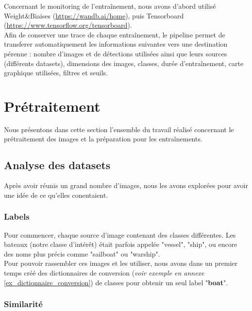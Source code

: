 Concernant le monitoring de l'entraînement, nous avons d'abord utilisé Weight\&Biaises
(\url{https://wandb.ai/home}), puis Tensorboard (\url{https://www.tensorflow.org/tensorboard}). \\

Afin de conserver une trace de chaque entraînement, le pipeline permet de transferer automatiquement
les informations suivantes vers une destination pérenne : nombre d'images et de détections utilisées
ainsi que leurs sources (différents datasets), dimensions des images, classes, durée d'entraînement,
carte graphique utilisées, filtres et seuils. \\

\section{Prétraitement}

Nous présentons dans cette section l'ensemble du travail réalisé concernant le prétraitement des images
et la préparation pour les entraînements.

\subsection{Analyse des datasets}

Après avoir réunis un grand nombre d'images, nous les avons explorées pour avoir une idée de ce qu'elles
conentaient.

\subsubsection{Labels}

Pour commencer, chaque source d'image contenant des classes différentes. Les bateaux
(notre classe d'intérêt) était parfois appelée "vessel", "ship", ou encore des noms plus précis
comme "sailboat" ou "warship".\\

Pour pouvoir rassembler ces images et les utiliser, nous avons dans un premier temps
créé des dictionnaires de conversion (\textit{voir exemple en annexe }\ref{ex_dictionnaire_conversion}) de classes pour obtenir un seul label "\textbf{boat}".

\subsubsection{Similarité}
\label{similarite}

